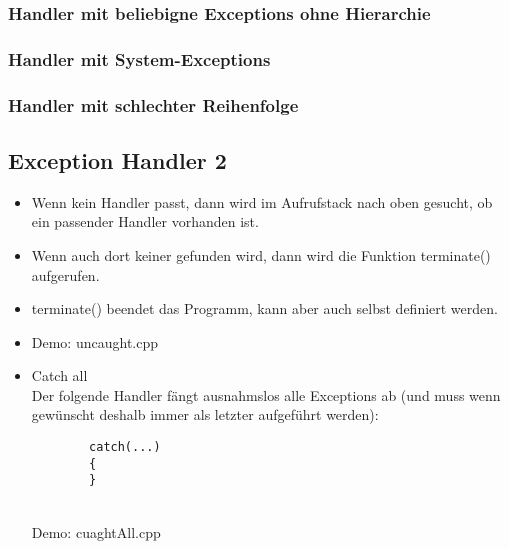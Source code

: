 \subsubsection{Handler mit beliebigne Exceptions ohne Hierarchie}
\label{sec:Handler mit beliebigne Exceptions ohne Hierarchie}


\subsubsection{Handler mit System-Exceptions}
\label{sec:Handler mit System-Exceptions}


\subsubsection{Handler mit schlechter Reihenfolge}
\label{sec:Handler mit schlechter Reihenfolge}


\subsection{Exception Handler 2}
\label{sec:Exception Handler 2}
\begin{itemize}
	\item Wenn kein Handler passt, dann wird im Aufrufstack nach oben gesucht, ob ein passender Handler vorhanden ist.
	\item Wenn auch dort keiner gefunden wird, dann wird die Funktion terminate() aufgerufen.
	\item terminate() beendet das Programm, kann aber auch selbst definiert werden.
	\item[\-] Demo: uncaught.cpp
	\item Catch all\\
	Der folgende Handler fängt ausnahmslos alle Exceptions ab (und muss wenn gewünscht deshalb immer als letzter aufgeführt werden):\\
	\noindent
	\begin{minipage}{\linewidth}
		\begin{lstlisting}
		catch(...)
		{
		}
		\end{lstlisting}
	\end{minipage}
	\\
	Demo: cuaghtAll.cpp
\end{itemize}


